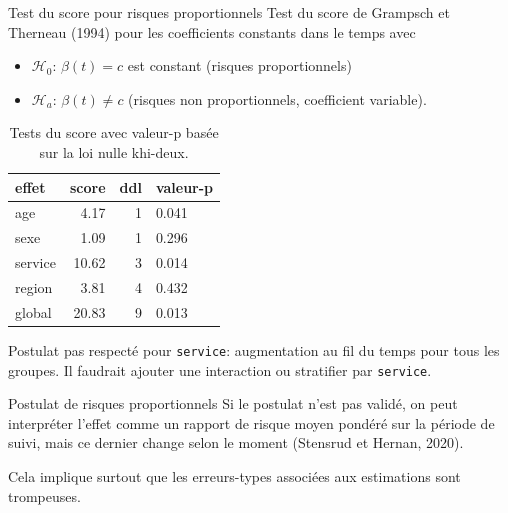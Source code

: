 \documentclass[
  ignorenonframetext,
]{beamer}
\providecommand{\tightlist}{%
  \setlength{\itemsep}{0pt}\setlength{\parskip}{0pt}}\usepackage{longtable,booktabs,array}
\begin{document}
\begin{frame}[fragile]{Test du score pour risques proportionnels}
\protect\hypertarget{test-du-score-pour-risques-proportionnels}{}
Test du score de Grampsch et Therneau (1994) pour les coefficients
constants dans le temps avec

\begin{itemize}
\tightlist
\item
  \(\mathscr{H}_0\): \(\beta(t)=c\) est constant (risques
  proportionnels)
\item
  \(\mathscr{H}_a\): \(\beta(t) \neq c\) (risques non proportionnels,
  coefficient variable).
\end{itemize}

\hypertarget{tbl-coxph-hypothese}{}
\begin{table}
\caption{\label{tbl-coxph-hypothese}Tests du score avec valeur-p basée sur la loi nulle khi-deux. }\tabularnewline

\centering
\begin{tabular}{lrrl}
\toprule
effet & score & ddl & valeur-p\\
\midrule
age & 4.17 & 1 & 0.041\\
sexe & 1.09 & 1 & 0.296\\
service & 10.62 & 3 & 0.014\\
region & 3.81 & 4 & 0.432\\
global & 20.83 & 9 & 0.013\\
\bottomrule
\end{tabular}
\end{table}

\footnotesize

Postulat pas respecté pour \texttt{service}: augmentation au fil du
temps pour tous les groupes. Il faudrait ajouter une interaction ou
stratifier par \texttt{service}.
\end{frame}

\begin{frame}{Postulat de risques proportionnels}
\protect\hypertarget{postulat-de-risques-proportionnels-1}{}
Si le postulat n'est pas validé, on peut interpréter l'effet comme un
rapport de risque moyen pondéré sur la période de suivi, mais ce dernier
change selon le moment (Stensrud et Hernan, 2020).

Cela implique surtout que les erreurs-types associées aux estimations
sont trompeuses.
\end{frame}
\end{document}
